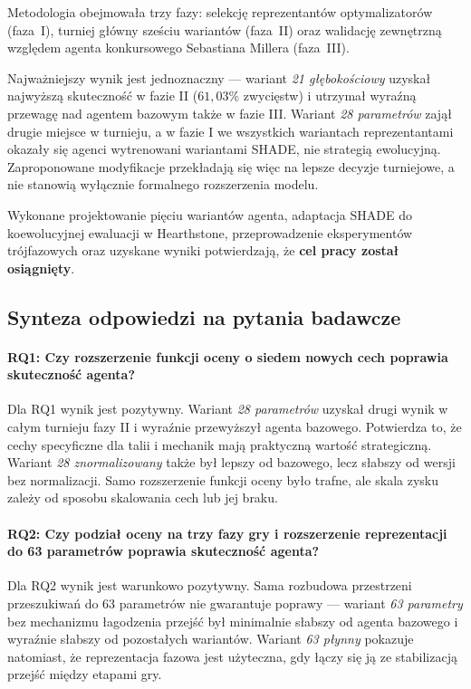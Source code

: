 Metodologia obejmowała trzy fazy: selekcję reprezentantów optymalizatorów (faza~I), turniej główny sześciu wariantów (faza~II) oraz walidację zewnętrzną względem agenta konkursowego Sebastiana Millera (faza~III).

Najważniejszy wynik jest jednoznaczny --- wariant \textit{21 głębokościowy} uzyskał najwyższą skuteczność w fazie II (\(61{,}03\%\) zwycięstw) i utrzymał wyraźną przewagę nad agentem bazowym także w fazie III. Wariant \textit{28 parametrów} zajął drugie miejsce w turnieju, a w fazie I we wszystkich wariantach reprezentantami okazały się agenci wytrenowani wariantami SHADE, nie strategią ewolucyjną. Zaproponowane modyfikacje przekładają się więc na lepsze decyzje turniejowe, a nie stanowią wyłącznie formalnego rozszerzenia modelu.

Wykonane projektowanie pięciu wariantów agenta, adaptacja SHADE do koewolucyjnej ewaluacji w Hearthstone, przeprowadzenie eksperymentów trójfazowych oraz uzyskane wyniki potwierdzają, że \textbf{cel pracy został osiągnięty}.

\subsection{Synteza odpowiedzi na pytania badawcze}

\paragraph{RQ1: Czy rozszerzenie funkcji oceny o siedem nowych cech poprawia skuteczność agenta?}
Dla RQ1 wynik jest pozytywny. Wariant \textit{28 parametrów} uzyskał drugi wynik w całym turnieju fazy II i wyraźnie przewyższył agenta bazowego. Potwierdza to, że cechy specyficzne dla talii i mechanik mają praktyczną wartość strategiczną. Wariant \textit{28 znormalizowany} także był lepszy od bazowego, lecz słabszy od wersji bez normalizacji. Samo rozszerzenie funkcji oceny było trafne, ale skala zysku zależy od sposobu skalowania cech lub jej braku.

\paragraph{RQ2: Czy podział oceny na trzy fazy gry i rozszerzenie reprezentacji do 63 parametrów poprawia skuteczność agenta?}
Dla RQ2 wynik jest warunkowo pozytywny. Sama rozbudowa przestrzeni przeszukiwań do 63 parametrów nie gwarantuje poprawy --- wariant \textit{63 parametry} bez mechanizmu łagodzenia przejść był minimalnie słabszy od agenta bazowego i wyraźnie słabszy od pozostałych wariantów. Wariant \textit{63 płynny} pokazuje natomiast, że reprezentacja fazowa jest użyteczna, gdy łączy się ją ze stabilizacją przejść między etapami gry.

